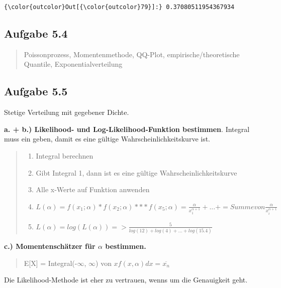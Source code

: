 \documentclass[11pt]{article}
\providecommand{\tightlist}{%
      \setlength{\itemsep}{0pt}\setlength{\parskip}{0pt}}
\begin{document}
\begin{Verbatim}[commandchars=\\\{\}]
{\color{outcolor}Out[{\color{outcolor}79}]:} 0.37080511954367934
\end{Verbatim}
            
    \subsection{Aufgabe 5.4}\label{aufgabe-5.4}

\begin{quote}
Poissonprozess, Momentenmethode, QQ-Plot, empirische/theoretische
Quantile, Exponentialverteilung
\end{quote}

    \subsection{Aufgabe 5.5}\label{aufgabe-5.5}

    Stetige Verteilung mit gegebener Dichte.

\textbf{a. + b.) Likelihood- und Log-Likelihood-Funktion bestimmen}.
Integral muss ein geben, damit es eine gültige Wahrscheinlichkeitskurve
ist.

\begin{quote}
\begin{enumerate}
\def\labelenumi{\arabic{enumi}.}
\tightlist
\item
  Integral berechnen
\item
  Gibt Integral 1, dann ist es eine gültige Wahrscheinlichkeitskurve
\item
  Alle x-Werte auf Funktion anwenden
\item
  \(L(\alpha) = f(x_1 ; \alpha) * f(x_2 ; \alpha) *** f(x_5 ; \alpha) = \frac{\alpha}{x_1^{\alpha + 1}} + ... + = Summe von \frac{\alpha}{x_i^{\alpha + 1}}\)
\item
  \(L(\alpha) = log(L(\alpha)) => \frac{5}{log(12) + log(4) + ... + log(15.4)}\)
\end{enumerate}
\end{quote}

    \textbf{c.) Momentenschätzer für \(\alpha\) bestimmen.}

\begin{quote}
E{[}X{]} = Integral(-\(\infty\), \(\infty\)) von
\(xf(x, \alpha)dx = \overline{x_n}\)
\end{quote}

Die Likelihood-Methode ist eher zu vertrauen, wenns um die Genauigkeit
geht.


    
    
    
    
\end{document}

